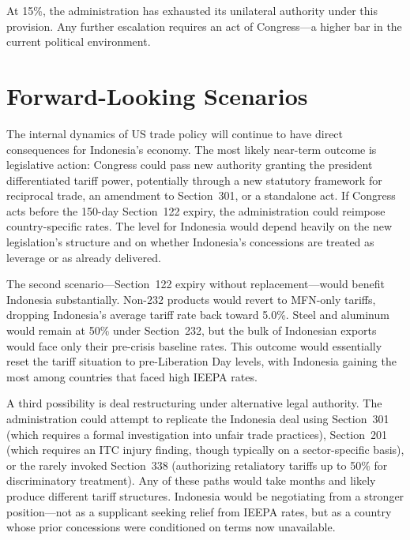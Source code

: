 \documentclass[12pt,a4paper]{article}
\begin{document}
At 15\%, the administration has exhausted its unilateral authority under this provision. Any further escalation requires an act of Congress---a higher bar in the current political environment.

\section{Forward-Looking Scenarios}

The internal dynamics of US trade policy will continue to have direct consequences for Indonesia's economy. The most likely near-term outcome is legislative action: Congress could pass new authority granting the president differentiated tariff power, potentially through a new statutory framework for reciprocal trade, an amendment to Section~301, or a standalone act. If Congress acts before the 150-day Section~122 expiry, the administration could reimpose country-specific rates. The level for Indonesia would depend heavily on the new legislation's structure and on whether Indonesia's concessions are treated as leverage or as already delivered.

The second scenario---Section~122 expiry without replacement---would benefit Indonesia substantially. Non-232 products would revert to MFN-only tariffs, dropping Indonesia's average tariff rate back toward 5.0\%. Steel and aluminum would remain at 50\% under Section~232, but the bulk of Indonesian exports would face only their pre-crisis baseline rates. This outcome would essentially reset the tariff situation to pre-Liberation Day levels, with Indonesia gaining the most among countries that faced high IEEPA rates.

A third possibility is deal restructuring under alternative legal authority. The administration could attempt to replicate the Indonesia deal using Section~301 (which requires a formal investigation into unfair trade practices), Section~201 (which requires an ITC injury finding, though typically on a sector-specific basis), or the rarely invoked Section~338 (authorizing retaliatory tariffs up to 50\% for discriminatory treatment). Any of these paths would take months and likely produce different tariff structures. Indonesia would be negotiating from a stronger position---not as a supplicant seeking relief from IEEPA rates, but as a country whose prior concessions were conditioned on terms now unavailable.
\end{document}
